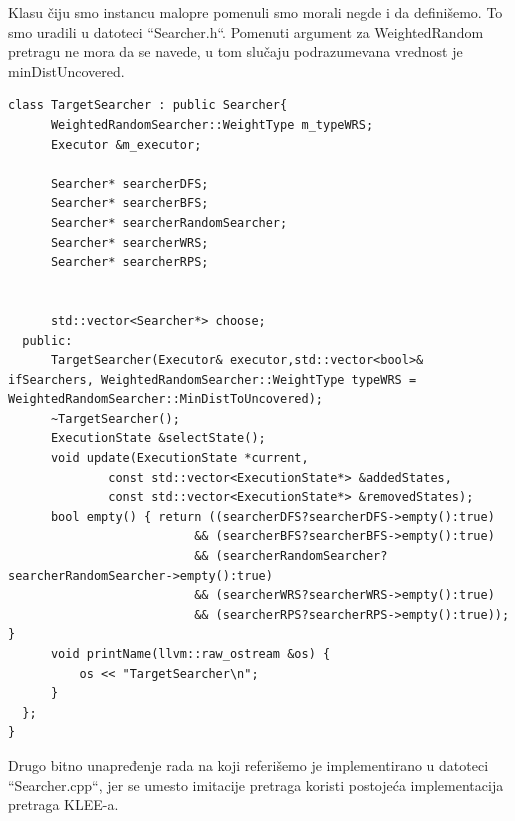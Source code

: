 \documentclass[a4paper]{article}
\begin{document}
Klasu čiju smo instancu malopre pomenuli smo morali negde i da definišemo. To smo uradili u datoteci ``Searcher.h``. Pomenuti argument za WeightedRandom pretragu ne mora da se navede, u tom slučaju podrazumevana vrednost je minDistUncovered. 
\begin{lstlisting}[title={TargetSearcher klasa}, label={lst:kod}]
class TargetSearcher : public Searcher{
      WeightedRandomSearcher::WeightType m_typeWRS;
      Executor &m_executor;
      
      Searcher* searcherDFS;
      Searcher* searcherBFS;
      Searcher* searcherRandomSearcher;
      Searcher* searcherWRS;
      Searcher* searcherRPS;
      
      
      std::vector<Searcher*> choose;
  public:
      TargetSearcher(Executor& executor,std::vector<bool>& ifSearchers, WeightedRandomSearcher::WeightType typeWRS = WeightedRandomSearcher::MinDistToUncovered);
      ~TargetSearcher();
	  ExecutionState &selectState();
	  void update(ExecutionState *current,
			  const std::vector<ExecutionState*> &addedStates,
			  const std::vector<ExecutionState*> &removedStates);
	  bool empty() { return ((searcherDFS?searcherDFS->empty():true) 
                          && (searcherBFS?searcherBFS->empty():true) 
                          && (searcherRandomSearcher?searcherRandomSearcher->empty():true) 
                          && (searcherWRS?searcherWRS->empty():true) 
                          && (searcherRPS?searcherRPS->empty():true)); }
	  void printName(llvm::raw_ostream &os) {
		  os << "TargetSearcher\n";
	  }
  };
}
\end{lstlisting}

Drugo bitno unapređenje rada na koji referišemo je implementirano u datoteci ``Searcher.cpp``, jer se umesto imitacije pretraga koristi postojeća implementacija pretraga KLEE-a. 
\end{document}
